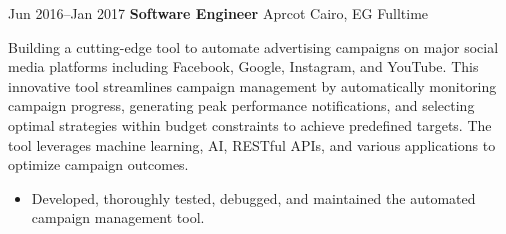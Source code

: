 \documentclass{subfiles}
\begin{document}

\cventry
    {Jun 2016--Jan 2017}
    {\textbf{Software Engineer}}
    {\textsc{}{Aprcot}}
    {Cairo, EG}
    {Fulltime}
    {
Building a cutting-edge tool to automate advertising campaigns on major social media platforms including Facebook, Google, Instagram, and YouTube. This innovative tool streamlines campaign management by automatically monitoring campaign progress, generating peak performance notifications, and selecting optimal strategies within budget constraints to achieve predefined targets. The tool leverages machine learning, AI, RESTful APIs, and various applications to optimize campaign outcomes.
\begin{itemize}
		\item  Developed, thoroughly tested, debugged, and maintained the automated campaign management tool.
\end{itemize}}
\end{document}
